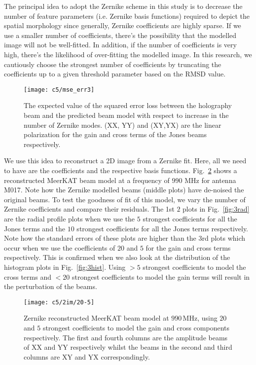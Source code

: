The principal idea to adopt the Zernike scheme in this study is to decrease the number of feature parameters (i.e. Zernike basis functions)
required to depict the spatial morphology since generally, Zernike coefficients are highly sparse. If we use a smaller number of coefficients, there's the possibility that the modelled image  will not be well-fitted. In addition, if the number of coefficients is very high, there's the likelihood of over-fitting the modelled image. In this research, we cautiously choose the strongest number of coefficients by truncating the coefficients up to a given threshold parameter based on the RMSD value.
\begin{figure}
\begin{minipage}[H]{\linewidth}
\centering
\texttt{[image: c5/mse\_err3]} %
\caption{\label{fig:beams_mse} The expected value of the squared error loss  between the holography beam and the predicted beam model with respect to 
increase in the number of Zernike modes. (XX, YY) and  (XY,YX) are the linear polarization for the gain and cross terms of the Jones beams respectively.}
\end{minipage}
\end{figure}
\FloatBarrier
We use this idea to reconstruct a 2D image from a Zernike fit. Here, all we need to have are the coefficients and the respective basis functions.
Fig.~\ref{fig:b20-5} shows a reconstructed MeerKAT beam model at a frequency of $990$ MHz for antenna M017. Note how the Zernike modelled beams (middle plots)
have de-noised the original beams. To test the goodness of fit of this model, we vary the number of Zernike coefficients and compare their residuals. The 1st $2$ plots in Fig.~\ref{fig:3rad} are the radial profile plots 
when we use the $5$ strongest coefficients for all the Jones terms and the $10$ strongest coefficients for all the Jones terms respectively. 
Note how the standard errors of these plots are higher than the 3rd plots which occur when we use the coefficients of $20$ and $5$  for the gain and cross terms respectively. This is confirmed when we also look at the distribution of the histogram plots in Fig.~\ref{fig:3hist}. Using $>5$ strongest coefficients to model the cross terms and  $<20$ strongest coefficients to model the gain terms will result in the perturbation of the beams. 

% 
\begin{figure}
\begin{minipage}[H]{\linewidth}
\centering
\texttt{[image: c5/2im/20-5]}
\caption{\label{fig:b20-5} Zernike reconstructed MeerKAT beam model at $990\, \mathrm{MHz}$, using $20$ and $5$ strongest coefficients to model the gain and cross components respectively. The first and fourth columns are the amplitude beams of XX and YY respectively whilst the beams in the second and third columns are XY and YX correspondingly.}
\end{minipage}
\end{figure}
\FloatBarrier


